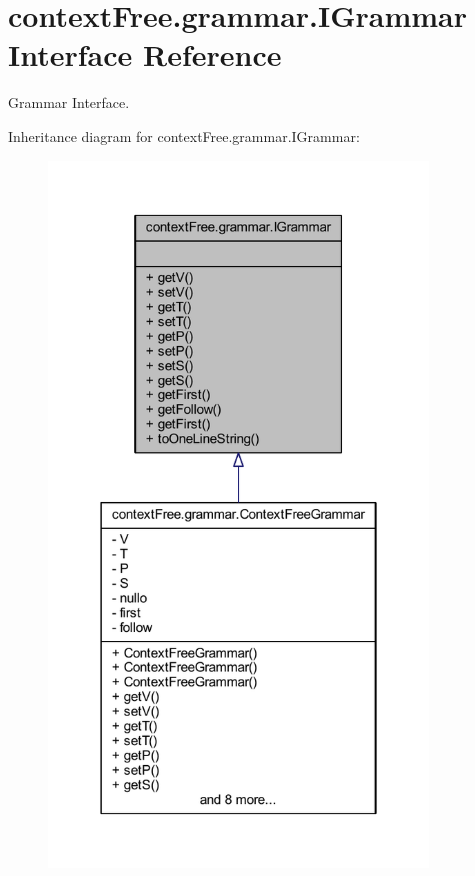 \hypertarget{interfacecontext_free_1_1grammar_1_1_i_grammar}{\section{context\-Free.\-grammar.\-I\-Grammar Interface Reference}
\label{interfacecontext_free_1_1grammar_1_1_i_grammar}
}


Grammar Interface.  




Inheritance diagram for context\-Free.\-grammar.\-I\-Grammar\-:
\nopagebreak
\begin{figure}[H]
\begin{center}
\leavevmode
\includegraphics[width=286pt]{interfacecontext_free_1_1grammar_1_1_i_grammar__inherit__graph}
\end{center}
\end{figure}
